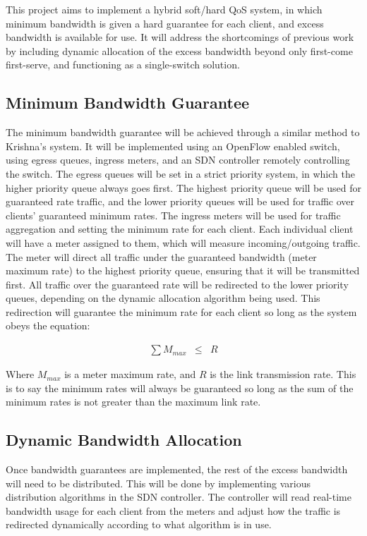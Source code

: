 \documentclass[accepted,single]{gipaper}
\begin{document}
This project aims to implement a hybrid soft/hard QoS system, in which minimum bandwidth is given a hard guarantee for each client, and excess bandwidth is available for use. It will address the shortcomings of previous work by including dynamic allocation of the excess bandwidth beyond only first-come first-serve, and functioning as a single-switch solution.

\subsection{Minimum Bandwidth Guarantee}
\label{sol_min_band}

The minimum bandwidth guarantee will be achieved through a similar method to Krishna’s \cite{Krishna:2016} system. It will be implemented using an OpenFlow enabled switch, using egress queues, ingress meters, and an SDN controller remotely controlling the switch. The egress queues will be set in a strict priority system, in which the higher priority queue always goes first. The highest priority queue will be used for guaranteed rate traffic, and the lower priority queues will be used for traffic over clients’ guaranteed minimum rates. The ingress meters will be used for traffic aggregation and setting the minimum rate for each client. Each individual client will have a meter assigned to them, which will measure incoming/outgoing traffic. The meter will direct all traffic under the guaranteed bandwidth (meter maximum rate) to the highest priority queue, ensuring that it will be transmitted first. All traffic over the guaranteed rate will be redirected to the lower priority queues, depending on the dynamic allocation algorithm being used. This redirection will guarantee the minimum rate for each client so long as the system obeys the equation:

\begin{eqnarray*}
	\sum M_{max} &\leq& R
\end{eqnarray*}

Where $M_{max}$ is a meter maximum rate, and $R$ is the link transmission rate. This is to say the minimum rates will always be guaranteed so long as the sum of the minimum rates is not greater than the maximum link rate.

\subsection{Dynamic Bandwidth Allocation}
\label{sol_dynamic_alloc}

Once bandwidth guarantees are implemented, the rest of the excess bandwidth will need to be distributed. This will be done by implementing various distribution algorithms in the SDN controller. The controller will read real-time bandwidth usage for each client from the meters and adjust how the traffic is redirected dynamically according to what algorithm is in use. 
\end{document}
